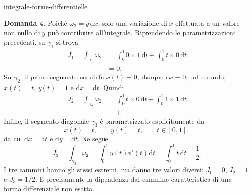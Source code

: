 \begin{exo}{integrale-forme-differentielle}
\begin{solution}
\textbf{Domanda 4.} Poiché $\omega_2=y\,\mathrm{d}x$, solo una variazione di
$x$ effettuata a un valore non nullo di $y$ può contribuire all'integrale.
Riprendendo le parametrizzazioni precedenti, su $\gamma_1$ si trova
\[\begin{aligned}J_1=\int_{\gamma_1}\omega_2&=\int_0^1 0\times1\,\mathrm{d}t+\int_0^1 t\times0\,\mathrm{d}t\\&=0.\end{aligned}\]
Su $\gamma_2$, il primo segmento soddisfa $x(t)=0$, dunque $\mathrm{d}x=0$;
sul secondo, $x(t)=t$, $y(t)=1$ e $\mathrm{d}x=\mathrm{d}t$. Quindi
\[\begin{aligned}J_2=\int_{\gamma_2}\omega_2&=\int_0^1 t\times0\,\mathrm{d}t+\int_0^1 1\times1\,\mathrm{d}t\\&=1.\end{aligned}\]
Infine, il segmento diagonale $\gamma_3$ è parametrizzato esplicitamente da
\[x(t)=t,\qquad y(t)=t,\qquad t\in[0,1],\]
da cui $\mathrm{d}x=\mathrm{d}t$ e $\mathrm{d}y=\mathrm{d}t$. Ne segue
\[J_3=\int_{\gamma_3}\omega_2=\int_0^1 y(t)x'(t)\,\mathrm{d}t=\int_0^1 t\,\mathrm{d}t=\frac12.\]
I tre cammini hanno gli stessi estremi, ma danno tre valori diversi: $J_1=0$,
$J_2=1$ e $J_3=1/2$. È precisamente la dipendenza dal cammino caratteristica
di una forma differenziale non esatta.
\end{solution}
\end{exo}

